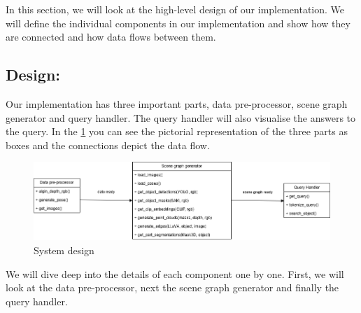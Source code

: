 In this section, we will look at the high-level design of our implementation. We will define the individual components in our
implementation and show how they are connected and how data flows between them.

\subsection{Design:}
Our implementation has three important parts, data pre-processor, scene graph generator and query handler. The query handler will also visualise
the answers to the query. In the \cref{fig:system_desgin} you can see the pictorial representation of the three parts as boxes and the connections depict the data flow.
\begin{figure}[ht!]
    \centering
    \includegraphics[width=\textwidth]{content/images/Design.png}
    \caption{System design}
    \label{fig:system_desgin}
\end{figure}

We will dive deep into the details of each component one by one. First, we will look at the data pre-processor, next the scene graph generator and finally 
the query handler.

